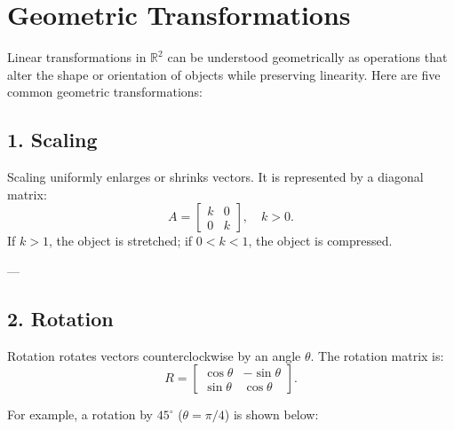 \documentclass[11pt]{article}
\begin{document}
\section{\textbf{Geometric Transformations}}

Linear transformations in \( \mathbb{R}^2 \) can be understood geometrically as operations that alter the shape or orientation of objects while preserving linearity. Here are five common geometric transformations:

\subsection*{1. Scaling}
Scaling uniformly enlarges or shrinks vectors. It is represented by a diagonal matrix:
\[
A = \begin{bmatrix} k & 0 \\ 0 & k \end{bmatrix}, \quad k > 0.
\]
If \( k > 1 \), the object is stretched; if \( 0 < k < 1 \), the object is compressed.

\begin{center}
\end{center}

---

\subsection*{2. Rotation}
Rotation rotates vectors counterclockwise by an angle \( \theta \). The rotation matrix is:
\[
R = \begin{bmatrix} \cos\theta & -\sin\theta \\ \sin\theta & \cos\theta \end{bmatrix}.
\]

For example, a rotation by \( 45^\circ \) (\( \theta = \pi/4 \)) is shown below:
\end{document}
